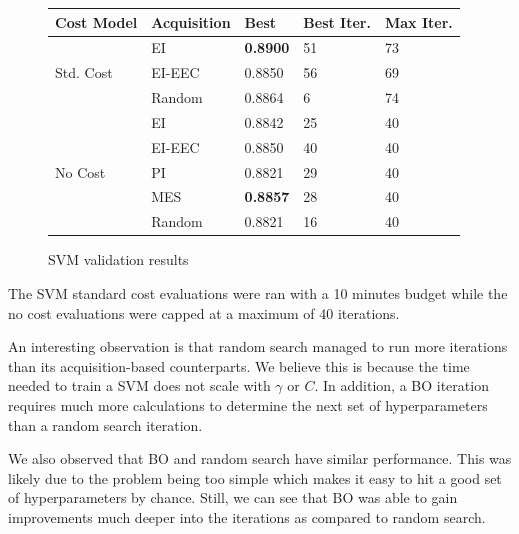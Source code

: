 \documentclass[letterpaper]{article}
\begin{document}
\begin{figure}[h]
\begin{center}
	\begin{tabular}{lllll}
		\hline
		Cost Model & Acquisition & Best & Best Iter. & Max Iter.\\
		\hline
		\multirow{3}{*}{Std. Cost} & EI &  \textbf{0.8900} & 51 & 73\\
		& EI-EEC & 0.8850 & 56 & 69\\
		& Random & 0.8864 & 6 & 74\\
		\hline
		\multirow{5}{*}{No Cost} & EI & 0.8842 & 25 & 40\\
		& EI-EEC & 0.8850 & 40 & 40\\
		& PI & 0.8821 & 29 & 40\\
		& MES & \textbf{0.8857} & 28 & 40\\
		& Random & 0.8821 & 16 & 40\\
		\hline
	\end{tabular}
\end{center}
	\caption{SVM validation results}
\end{figure}
The SVM standard cost evaluations were ran with a 10 minutes budget while the no cost evaluations were capped at a maximum of 40 iterations.

An interesting observation is that random search managed to run more iterations than its acquisition-based counterparts.
We believe this is because the time needed to train a SVM does not scale with $\gamma$ or $\textit{C}$.
In addition, a BO iteration requires much more calculations to determine the next set of hyperparameters than a random search iteration.

We also observed that BO and random search have similar performance.
This was likely due to the problem being too simple which makes it easy to hit a good set of hyperparameters by chance.
Still, we can see that BO was able to gain improvements much deeper into the iterations as compared to random search.
\end{document}
